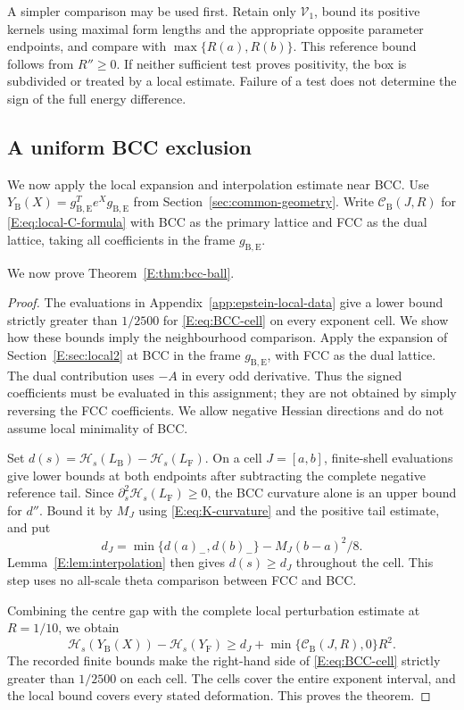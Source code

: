 \documentclass[reqno,english]{amsart}
\theoremstyle{definition}
\newtheorem{open problem}[theorem]{Open Problem}
\theoremstyle{remark}
\theoremstyle{plain}
\numberwithin{equation}{section}
\newcommand{\FCC}{L_{\mathrm F}}
\newcommand{\B}{L_{\mathrm B}}
\newcommand{\YF}{Y_{\mathrm F}}
\newcommand{\HH}{\mathcal H}
\newcommand{\gBE}{g_{\mathrm B,\mathrm E}}
\begin{document}
A simpler comparison may be used first. Retain only
$\mathcal V_1$, bound its positive kernels using maximal form
lengths and the appropriate opposite parameter endpoints, and
compare with $\max\{R(a),R(b)\}$. This reference bound follows
from $R''\ge0$. If neither sufficient test proves positivity,
the box is subdivided or treated by a local estimate. Failure of a
test does not determine the sign of the full energy difference.

\subsection{A uniform BCC exclusion}\label{E:sec:bcc-local}
We now apply the local expansion and interpolation estimate near
BCC. Use $Y_{\mathrm B}(X)=\gBE^Te^X\gBE$ from
Section~\ref{sec:common-geometry}. Write
$\mathcal C_{\mathrm B}(J,R)$ for \eqref{E:eq:local-C-formula}
with BCC as the primary lattice and FCC as the dual lattice, taking
all coefficients in the frame $\gBE$.


We now prove Theorem~\ref{E:thm:bcc-ball}.

\begin{proof}
The evaluations in Appendix~\ref{app:epstein-local-data} give a
lower bound strictly greater than $1/2500$ for
\eqref{E:eq:BCC-cell} on every exponent cell. We show how these
bounds imply the neighbourhood comparison. Apply the expansion of
Section~\ref{E:sec:local2} at BCC in the frame $\gBE$, with
FCC as the dual lattice. The dual contribution uses $-A$ in every
odd derivative. Thus the signed coefficients must be evaluated in
this assignment; they are not obtained by simply reversing the FCC
coefficients. We allow negative Hessian directions and do not assume
local minimality of BCC.

Set $d(s)=\HH_s(\B)-\HH_s(\FCC)$. On a cell $J=[a,b]$,
finite-shell evaluations give lower bounds at both endpoints after
subtracting the complete negative reference tail. Since
$\partial_s^2\HH_s(\FCC)\ge0$, the BCC curvature alone is an
upper bound for $d''$. Bound it by $M_J$ using
\eqref{E:eq:K-curvature} and the positive tail estimate, and put
\[
 d_J=\min\{d(a)_-,d(b)_-\}-M_J(b-a)^2/8.
\]
Lemma~\ref{E:lem:interpolation} then gives $d(s)\ge d_J$
throughout the cell. This step uses no all-scale theta comparison
between FCC and BCC.

Combining the centre gap with the complete local perturbation
estimate at $R=1/10$, we obtain
\begin{equation}
 \HH_s(Y_{\mathrm B}(X))-\HH_s(\YF)
 \ge d_J+\min\{\mathcal C_{\mathrm B}(J,R),0\}R^2.
 \label{E:eq:BCC-cell}
\end{equation}
The recorded finite bounds make the right-hand side of
\eqref{E:eq:BCC-cell} strictly greater than $1/2500$ on each
cell. The cells cover the entire exponent interval, and the local
bound covers every stated deformation. This proves the theorem.
\end{proof}
\end{document}

